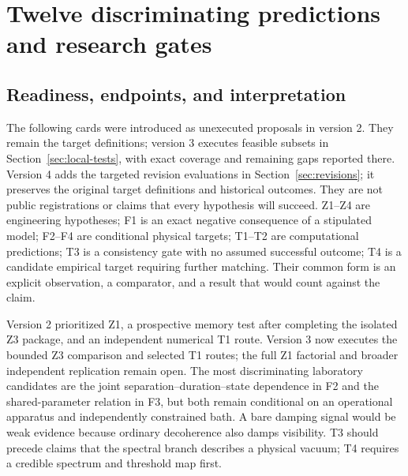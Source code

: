 \clearpage
\section{Twelve discriminating predictions and research gates}
\label{sec:predictions}
\subsection{Readiness, endpoints, and interpretation}
The following cards were introduced as unexecuted proposals in version 2. They remain the target definitions; version 3 executes feasible subsets in Section~\ref{sec:local-tests}, with exact coverage and remaining gaps reported there. Version 4 adds the targeted revision evaluations in Section~\ref{sec:revisions}; it preserves the original target definitions and historical outcomes. They are not public registrations or claims that every hypothesis will succeed. Z1--Z4 are engineering hypotheses; F1 is an exact negative consequence of a stipulated model; F2--F4 are conditional physical targets; T1--T2 are computational predictions; T3 is a consistency gate with no assumed successful outcome; T4 is a candidate empirical target requiring further matching. Their common form is an explicit observation, a comparator, and a result that would count against the claim.

Version 2 prioritized Z1, a prospective memory test after completing the isolated Z3 package, and an independent numerical T1 route. Version 3 now executes the bounded Z3 comparison and selected T1 routes; the full Z1 factorial and broader independent replication remain open. The most discriminating laboratory candidates are the joint separation--duration--state dependence in F2 and the shared-parameter relation in F3, but both remain conditional on an operational apparatus and independently constrained bath. A bare damping signal would be weak evidence because ordinary decoherence also damps visibility. T3 should precede claims that the spectral branch describes a physical vacuum; T4 requires a credible spectrum and threshold map first.

